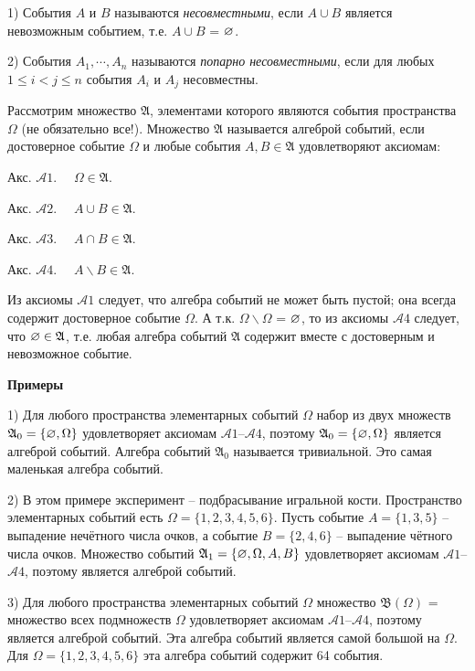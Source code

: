 \begin{definition}
	\label{def:2.7}
1) События $A$ и $B$ называются \textit{несовместными}, если
$A\cup B$ является невозможным событием, т.е. $A\cup B$ = $\varnothing$.

2) События $A_1,\cdots,A_n$ называются \textit{попарно несовместными}, если для любых $1\leq i<j\leq n$ события $A_i$ и $A_j$ несовместны.
\end{definition}

\begin{definition}
	\label{def:2.8}
Рассмотрим множество $\mathfrak{A}$, элементами которого являются события пространства $\Omega$ (не обязательно все!). Множество $\mathfrak{A}$ называется алгеброй событий, если достоверное событие $\Omega$ и любые события $A, B \in \mathfrak{A}$
удовлетворяют аксиомам:

Акс. $\mathcal{A}1$.$\quad$ $\Omega\in\mathfrak{A}$.

Акс. $\mathcal{A}2$.$\quad$ $A\cup B\in\mathfrak{A}$.

Акс. $\mathcal{A}3$.$\quad$ $A\cap B\in\mathfrak{A}$.

Акс. $\mathcal{A}4$.$\quad$ $A\backslash B\in\mathfrak{A}$.


Из аксиомы $\mathcal{A}1$ следует, что алгебра событий не может быть пустой; она всегда содержит достоверное событие $\Omega$. А т.к. $\Omega \backslash \Omega$ = $\varnothing$, то из аксиомы $\mathcal{A}4$ следует, что $\varnothing\in\mathfrak{A}$, т.е. любая алгебра событий $\mathfrak{A}$ содержит вместе с достоверным и невозможное событие.
\end{definition}

\textbf{Примеры}

1) Для любого пространства элементарных событий $\Omega$ набор из двух множеств $\mathfrak{A}_0=\{\varnothing,\Omega\}$ удовлетворяет аксиомам $\mathcal{A}1$--$\mathcal{A}4$, поэтому $\mathfrak{A}_0=\{\varnothing,\Omega\}$ является алгеброй событий. Алгебра событий $\mathfrak{A_0}$ называется тривиальной. Это самая маленькая алгебра событий.

2) В этом примере эксперимент -- подбрасывание игральной кости. 
Пространство элементарных событий есть $\Omega = \{1, 2, 3, 4, 5, 6\}$. 
Пусть событие $A = \{1, 3, 5\}$ -- выпадение нечётного числа очков, а событие $B= \{2, 4, 6\}$ -- выпадение чётного числа очков. 
Множество событий $\mathfrak{A}_1 = \{\varnothing, \Omega, A, B\}$ удовлетворяет аксиомам $\mathcal{A}1$--$\mathcal{A}4$, поэтому является алгеброй событий.

3) Для любого пространства элементарных событий $\Omega$ множество $\mathfrak{B}(\Omega)$ = множество всех подмножеств $\Omega$ удовлетворяет аксиомам $\mathcal{A}1$--$\mathcal{A}4$, поэтому является алгеброй событий. 
Эта алгебра событий является самой большой на $\Omega$. Для $\Omega= \{1, 2, 3, 4, 5, 6\}$ эта алгебра событий содержит 64 события.

